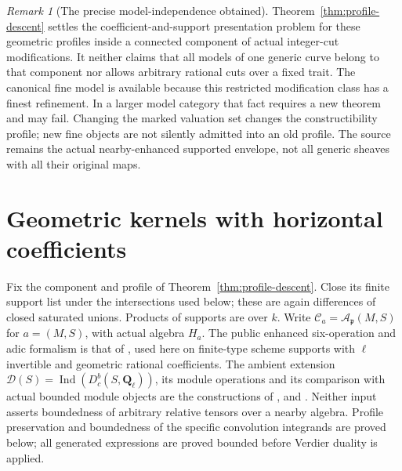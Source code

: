\documentclass[11pt]{article}
\theoremstyle{definition}
\theoremstyle{remark}
\newtheorem{remark}[theorem]{Remark}
\newcommand{\Qell}{\mathbf Q_\ell}
\begin{document}
\begin{remark}[The precise model-independence obtained]
Theorem~\ref{thm:profile-descent} settles the coefficient-and-support
presentation problem for these geometric profiles inside a connected
component of actual integer-cut modifications.  It neither claims
that all models of one generic curve belong to that component nor
allows arbitrary rational cuts over a fixed trait.  The canonical
fine model is available because this restricted modification class
has a finest refinement.  In a larger model category that fact
requires a new theorem and may fail.  Changing the marked valuation
set changes the constructibility profile; new fine objects are not
silently admitted into an old profile.  The source remains the
actual nearby-enhanced supported envelope, not all generic sheaves
with all their original maps.
\end{remark}

\section{Geometric kernels with horizontal coefficients}
\label{sec:profile-kernels}
Fix the component and profile of Theorem~\ref{thm:profile-descent}.
Close its finite support list under the intersections used below;
these are again differences of closed saturated unions.  Products
of supports are over $k$.  Write $\mathcal C_a=\mathcal
A_{\mathfrak p}(M,S)$ for $a=(M,S)$, with actual algebra $H_a$.
The public enhanced six-operation and adic formalism is that of
\cite{LZEnhanced,LZAdic}, used here on finite-type scheme supports
with $\ell$ invertible and geometric rational coefficients.
The ambient extension
$\mathscr D(S)=\operatorname{Ind}(D_c^b(S,\Qell))$, its module
operations and its comparison with actual bounded module objects
are the constructions of \cite{Kernels},
 and .
Neither input asserts boundedness of arbitrary relative tensors
over a nearby algebra. Profile preservation and boundedness of the
specific convolution integrands are proved below; all generated
expressions are proved bounded before Verdier duality is applied.
\end{document}
